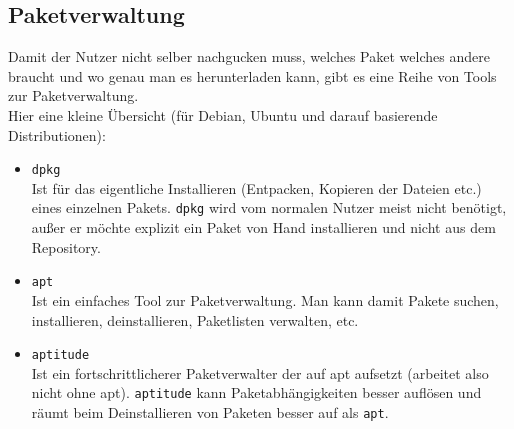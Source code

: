 \documentclass[a4paper,12pt]{article}
\begin{document}
\subsection{Paketverwaltung}
Damit der Nutzer nicht selber nachgucken muss, welches Paket welches 
andere braucht und wo genau man es herunterladen kann, gibt es eine 
Reihe von Tools zur Paketverwaltung.\\
Hier eine kleine Übersicht (für Debian, Ubuntu und darauf basierende
Distributionen):
\begin{itemize}
\item \texttt{dpkg} \\
Ist für das eigentliche Installieren (Entpacken, Kopieren der Dateien etc.) 
eines einzelnen Pakets. \texttt{dpkg} wird vom normalen Nutzer meist 
nicht benötigt, außer er möchte explizit ein Paket von Hand installieren 
und nicht aus dem Repository.
\item \texttt{apt} \\ 
Ist ein einfaches Tool zur Paketverwaltung. Man kann damit Pakete suchen, 
installieren, deinstallieren, Paketlisten verwalten, etc.
\item \texttt{aptitude} \\ 
Ist ein fortschrittlicherer Paketverwalter der auf apt aufsetzt (arbeitet 
also nicht ohne apt). \texttt{aptitude} kann Paketabhängigkeiten besser 
auflösen und räumt beim Deinstallieren von Paketen besser auf als \texttt{apt}.
\end{itemize}
\end{document}
